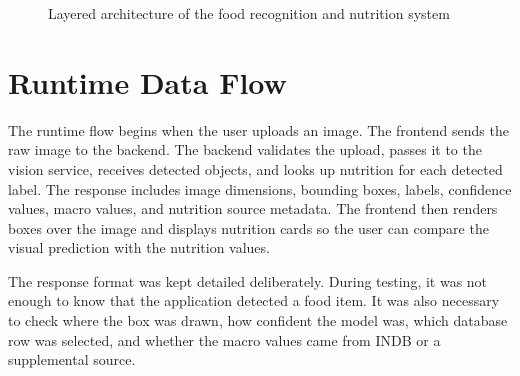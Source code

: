 \begin{figure}[H]
\centering
{}
\caption{Layered architecture of the food recognition and nutrition system}
\label{fig:system-architecture}
\end{figure}

\section{Runtime Data Flow}

The runtime flow begins when the user uploads an image. The frontend sends the raw image to the backend. The backend validates the upload, passes it to the vision service, receives detected objects, and looks up nutrition for each detected label. The response includes image dimensions, bounding boxes, labels, confidence values, macro values, and nutrition source metadata. The frontend then renders boxes over the image and displays nutrition cards so the user can compare the visual prediction with the nutrition values.

The response format was kept detailed deliberately. During testing, it was not enough to know that the application detected a food item. It was also necessary to check where the box was drawn, how confident the model was, which database row was selected, and whether the macro values came from INDB or a supplemental source.

